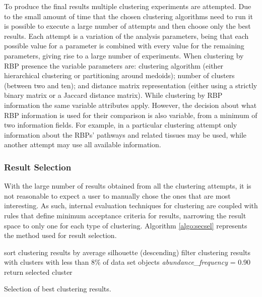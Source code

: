 To produce the final results multiple clustering experiments are attempted. Due
to the small amount of time that the chosen clustering algorithms need to run it
is possible to execute a large number of attempts and then choose only the best
results. Each attempt is a variation of the analysis parameters, being that each
possible value for a parameter is combined with every value for the remaining
parameters, giving rise to a large number of experiments. When clustering by RBP
presence the variable parameters are: clustering algorithm (either hierarchical
clustering or partitioning around medoids); number of clusters (between two and
ten); and distance matrix representation (either using a strictly binary matrix
or a Jaccard distance matrix). While clustering by RBP information the same
variable attributes apply. However, the decision about what RBP information is
used for their comparison is also variable, from a minimum of two information
fields. For example, in a particular clustering attempt only information about
the RBPs' pathways and related tissues may be used, while another attempt may
use all available information.

\subsubsection*{Result Selection}

With the large number of results obtained from all the clustering attempts, it
is not reasonable to expect a user to manually chose the ones that are most
interesting. As such, internal evaluation techniques for clustering are coupled
with rules that define minimum acceptance criteria for results, narrowing the
result space to only one for each type of clustering. Algorithm
\ref{algo:secsel} represents the method used for result selection.

\begin{algorithm}
  sort clustering results by average silhouette (descending)\;
  filter clustering results with clusters with less than 8\% of data set objects\;
  \emph{abundance\_frequency} = 0.90\;
   {
    return selected cluster\;
  }

  \caption[Selection of best clustering results]{
    Selection of best clustering results.
  }
  \label{algo:secsel}
\end{algorithm}

